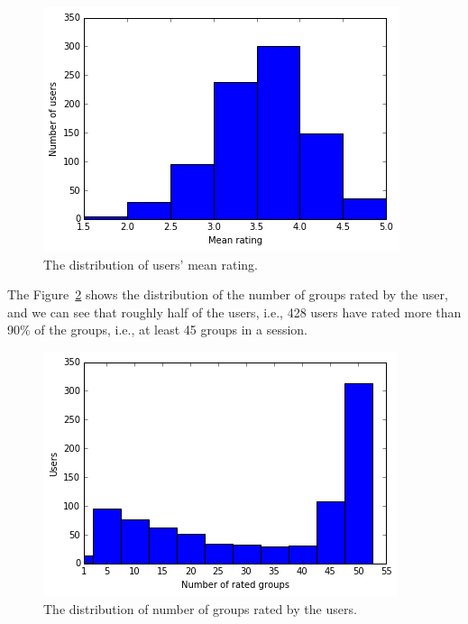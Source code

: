 \begin{figure}[ht]
  \includegraphics[scale=0.65]{figures/meanratingdist.png}
  \caption{The distribution of users' mean rating.}
  \label{fig:meanratingdist}
\end{figure}



The Figure~\ref{fig:usergroupdist} shows the distribution of the number of groups rated by the user,
and we can see that roughly half of the users, i.e., 428 users have rated more
than 90\% of the groups, i.e., at least 45 groups in a session.

\begin{figure}[ht]
  \includegraphics[scale=0.65]{figures/usergroupdist.png}
  \caption{The distribution of number of groups rated by the users.}
  \label{fig:usergroupdist}
\end{figure}


